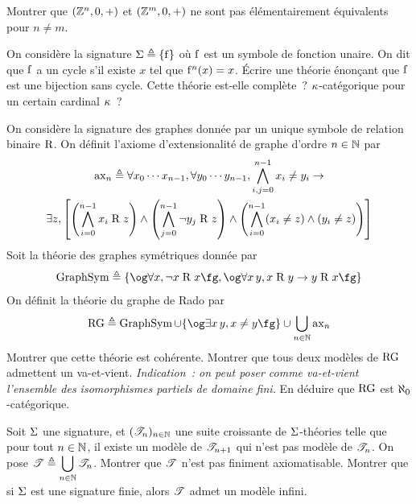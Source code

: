 \begin{exercise}
  Montrer que $(\mathbb Z^n,0,+)$ et $(\mathbb Z^m,0,+)$ ne sont pas élémentairement
  équivalents pour $n \neq m$.
\end{exercise}

\begin{exercise}
  On considère la signature $\Sigma \triangleq \{\mathrm{f}\}$ où $\mathrm{f}$ est un symbole
  de fonction unaire. On dit que $\mathrm{f}$ a un cycle s'il existe $x$ tel que
  $\mathrm{f}^n(x) = x$. \'Ecrire une théorie énonçant que $\mathrm{f}$ est une
  bijection sans cycle. Cette théorie est-elle complète~? $\kappa$-catégorique
  pour un certain cardinal $\kappa$~?
\end{exercise}

\begin{exercise}\label{exo.rado}
  On considère la signature des graphes donnée par un unique symbole de relation
  binaire $\mathrm{R}$. On définit l'axiome d'extensionalité de graphe d'ordre
  $n\in\mathbb N$ par
  \begin{multline*}
    \operatorname{ax}_n \triangleq \forall x_0\cdots x_{n-1},\forall y_0\cdots y_{n-1},
    \bigwedge_{i,j = 0}^{n-1}x_i\neq y_i \to \\
    \exists z,\left[ \left(\bigwedge_{i=0}^{n-1}x_i\mathrel{\mathrm{R}} z\right)\land
      \left(\bigwedge_{j = 0}^{n-1}\lnot y_j\mathrel{\mathrm{R}} z\right)\land
      \left(\bigwedge_{i = 0}^{n-1} (x_i \neq z) \land (y_i \neq z)\right)
      \right]
  \end{multline*}
  Soit la théorie des graphes symétriques donnée par
  \[\GraphSym \defeq \{\ogM \forall x, \lnot x\mathrel{\symbR} x\fgM,
  \ogM\forall x\,y, x \mathrel{\symbR} y \to y\mathrel{\symbR} x\fgM\}\]
  On définit la théorie du graphe de Rado par
  \[\RG \defeq \GraphSym \cup \{\ogM \exists x\,y, x\neq y\fgM\}\cup
  \bigcup_{n\in \bN} \Rax_n\]
  Montrer que cette théorie est cohérente. Montrer que tous deux modèles de
  $\operatorname{RG}$ admettent un va-et-vient. \textit{Indication~: on peut poser comme
    va-et-vient l'ensemble des isomorphismes partiels de domaine fini.}
  En déduire que $\operatorname{RG}$ est $\aleph_0$-catégorique.
\end{exercise}

\begin{exercise}
  Soit $\Sigma$ une signature, et $(\mathscr T_n)_{n\in\mathbb N}$ une suite croissante de
  $\Sigma$-théories telle que pour tout $n\in\mathbb N$, il existe un modèle de
  $\mathscr T_{n+1}$ qui n'est pas modèle de $\mathscr T_n$. On pose
  $\displaystyle\mathscr T \triangleq\bigcup_{n\in\mathbb N}\mathscr T_n$. Montrer que $\mathscr T$ n'est
  pas finiment axiomatisable. Montrer que si $\Sigma$ est une signature finie,
  alors $\mathscr T$ admet un modèle infini.
\end{exercise}

